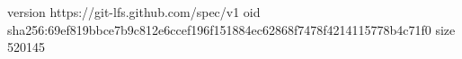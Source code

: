 version https://git-lfs.github.com/spec/v1
oid sha256:69ef819bbce7b9c812e6ccef196f151884ec62868f7478f4214115778b4c71f0
size 520145
